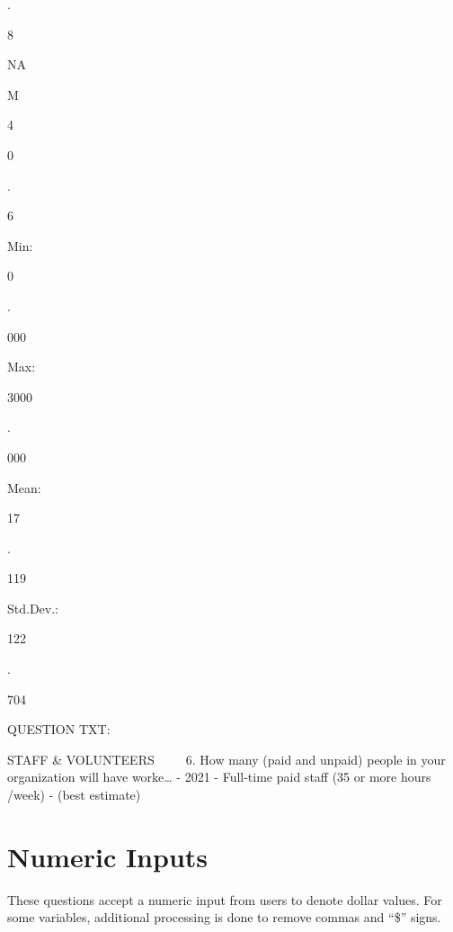 \documentclass[
  letterpaper,
]{scrbook}
\begin{document}
.

8

NA

M

4

0

.

6

Min:

0

.

000

Max:

3000

.

000

Mean:

17

.

119

Std.Dev.:

122

.

704

QUESTION TXT:

STAFF \& VOLUNTEERS ~~ ~ 6. How many (paid and unpaid) people in your
organization will have worke\ldots{} - 2021 - Full-time paid staff (35
or more hours /week) - (best estimate)

\chapter{Numeric Inputs}\label{numeric-inputs}

These questions accept a numeric input from users to denote dollar
values. For some variables, additional processing is done to remove
commas and ``\$'' signs.
\end{document}
